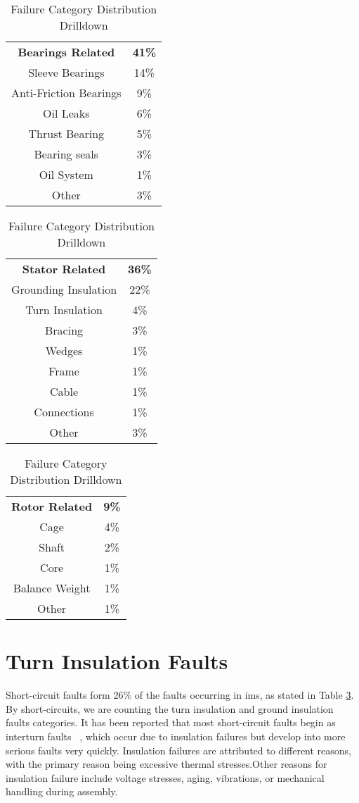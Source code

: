 \begin{table}[htbp]
\caption{Failure Category Distribution Drilldown}
\label{tab:failure_distribution_drilldown}
\begin{tabular}{cc}
\multicolumn{1}{c}{\textbf{Bearings Related}} & \multicolumn{1}{c}{\textbf{41\%}} \\
Sleeve Bearings & 14\% \\
Anti-Friction Bearings  & 9\% \\
Oil Leaks & 6\% \\
Thrust Bearing & 5\% \\
Bearing seals & 3\% \\
Oil System & 1\% \\
Other & 3\%
\end{tabular}
\begin{tabular}{cc}
\multicolumn{1}{c}{\textbf{Stator Related}} & \multicolumn{1}{c}{\textbf{36\%}} \\
Grounding Insulation & 22\% \\
Turn Insulation  & 4\% \\
Bracing & 3\% \\
Wedges & 1\% \\
Frame & 1\% \\
Cable & 1\% \\
Connections & 1\% \\
Other & 3\%
\end{tabular}
\begin{tabular}{cc}
\multicolumn{1}{c}{\textbf{Rotor Related}} & \multicolumn{1}{c}{\textbf{9\%}} \\
Cage & 4\% \\
Shaft  & 2\% \\
Core & 1\% \\
Balance Weight & 1\% \\
Other & 1\%
\end{tabular}
\end{table}


\section{Turn Insulation Faults}
\label{sec:turn_insulation_faults}

Short-circuit faults form 26\% of the faults occurring in \acrshort{ims}, as stated in Table \ref{tab:failure_distribution_drilldown}. By short-circuits, we are counting the turn insulation and ground insulation faults categories.
It has been reported that most short-circuit faults begin as interturn faults ~\cite{Bonnett1992}, which occur due to insulation failures but develop into more serious faults very quickly.
Insulation failures are attributed to different reasons, with the primary reason being excessive thermal stresses.Other reasons for insulation failure include voltage stresses, aging, vibrations, or mechanical handling during assembly.

